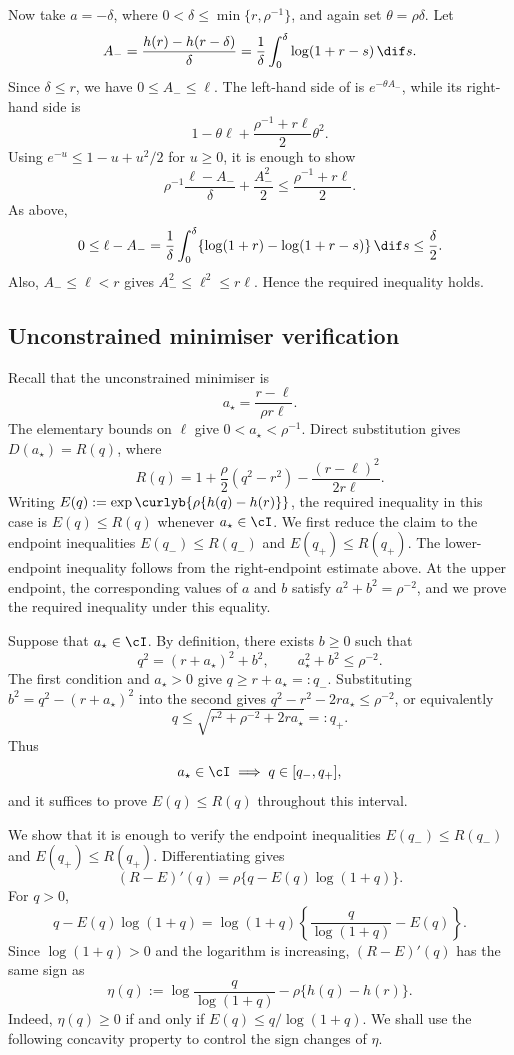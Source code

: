 \documentclass[11pt]{article}
\let\cref\zcref
\begin{document}
Now take $a=-\delta$, where $0<\delta\leq\min\{r,\rho^{-1}\}$, and again set $\theta=\rho\delta$. Let
\[
  A_-=\frac{h(r)-h(r-\delta)}{\delta}=\frac1\delta\int_0^\delta\log(1+r-s)\,\dif s.
\]
Since $\delta\leq r$, we have $0\leq A_-\leq\ell$. The left-hand side of \cref{eq:right-endpoint-estimate} is $e^{-\theta A_-}$, while its right-hand side is
\[
  1-\theta\ell+\frac{\rho^{-1}+r\ell}{2}\theta^2.
\]
Using $e^{-u}\leq1-u+u^2/2$ for $u\geq0$, it is enough to show
\[
  \rho^{-1}\frac{\ell-A_-}{\delta}+\frac{A_-^2}{2}\leq\frac{\rho^{-1}+r\ell}{2}.
\]
As above,
\[
  0\leq\ell-A_-=\frac1\delta\int_0^\delta\{\log(1+r)-\log(1+r-s)\}\,\dif s\leq\frac\delta2.
\]
Also, $A_-\leq\ell<r$ gives $A_-^2\leq\ell^2\leq r\ell$. Hence the required inequality holds.

\subsection{Unconstrained minimiser verification}

Recall that the unconstrained minimiser is
\[
  a_\star=\frac{r-\ell}{\rho r\ell}.
\]
The elementary bounds on $\ell$ give $0<a_\star<\rho^{-1}$. Direct substitution gives $D(a_\star)=R(q)$, where
\[
  R(q)=1+\frac{\rho}{2}(q^2-r^2)-\frac{(r-\ell)^2}{2r\ell}.
\]
Writing $E(q):=\exp\curlyb{\rho\{h(q)-h(r)\}}$, the required inequality in this case is $E(q)\leq R(q)$ whenever $a_\star\in\cI$. We first reduce the claim to the endpoint inequalities $E(q_-)\leq R(q_-)$ and $E(q_+)\leq R(q_+)$. The lower-endpoint inequality follows from the right-endpoint estimate above. At the upper endpoint, the corresponding values of $a$ and $b$ satisfy $a^2+b^2=\rho^{-2}$, and we prove the required inequality under this equality.

Suppose that $a_\star\in\cI$. By definition, there exists $b\geq0$ such that
\[
  q^2=(r+a_\star)^2+b^2, \qquad a_\star^2+b^2\leq\rho^{-2}.
\]
The first condition and $a_\star>0$ give $q\geq r+a_\star=:q_-$. Substituting $b^2=q^2-(r+a_\star)^2$ into the second gives $q^2-r^2-2ra_\star\leq\rho^{-2}$, or equivalently
\[
  q\leq\sqrt{r^2+\rho^{-2}+2ra_\star}=:q_+.
\]
Thus
\[
  a_\star\in\cI \implies q\in[q_-,q_+],
\]
and it suffices to prove $E(q)\leq R(q)$ throughout this interval.

We show that it is enough to verify the endpoint inequalities $E(q_-)\leq R(q_-)$ and $E(q_+)\leq R(q_+)$. Differentiating gives
\[
  (R-E)'(q)=\rho\{q-E(q)\log(1+q)\}.
\]
For $q>0$,
\[
  q-E(q)\log(1+q)=\log(1+q)\left\{\frac{q}{\log(1+q)}-E(q)\right\}.
\]
Since $\log(1+q)>0$ and the logarithm is increasing, $(R-E)'(q)$ has the same sign as
\[
  \eta(q):=\log\frac{q}{\log(1+q)}-\rho\{h(q)-h(r)\}.
\]
Indeed, $\eta(q)\geq0$ if and only if $E(q)\leq q/\log(1+q)$. We shall use the following concavity property to control the sign changes of $\eta$.
\end{document}
